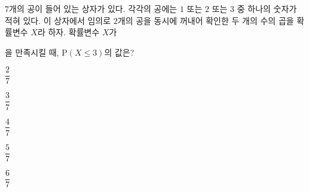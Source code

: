 $7$개의 공이 들어 있는 상자가 있다. 각각의 공에는 $1$ 또는 $2$ 또는 $3$ 중 하나의 숫자가 적혀 있다. 이 상자에서 임의로 $2$개의 공을 동시에 꺼내어 확인한 두 개의 수의 곱을 확률변수 $X$라 하자. 확률변수 $X$가 \par\smallskip{}\par\smallskip\noindent 을 만족시킬 때, $\mathrm{P}(X\le 3)$의 값은?
\begin{choices32}{\rule[-3ex]{0pt}{8ex}$\dfrac{2}{7}$}{\rule[-3ex]{0pt}{8ex}$\dfrac{3}{7}$}{\rule[-3ex]{0pt}{8ex}$\dfrac{4}{7}$}{\rule[-3ex]{0pt}{8ex}$\dfrac{5}{7}$}{\rule[-3ex]{0pt}{8ex}$\dfrac{6}{7}$}\end{choices32}
